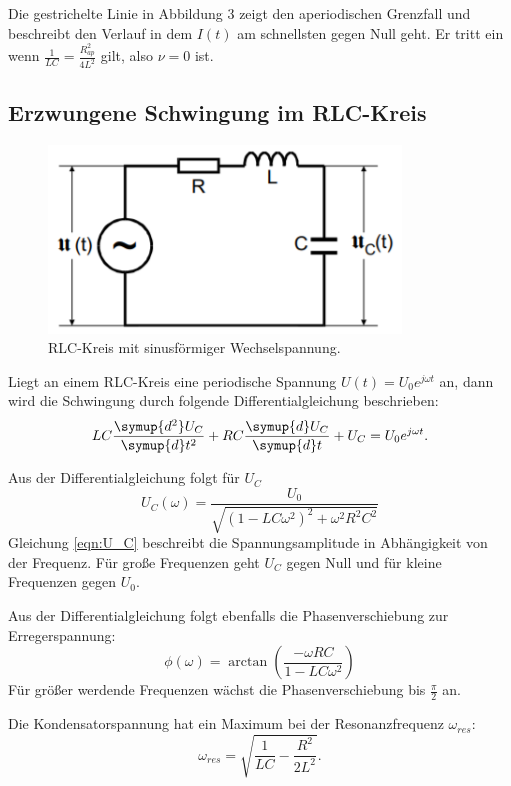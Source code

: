 Die gestrichelte Linie in Abbildung 3 zeigt den aperiodischen Grenzfall und beschreibt den Verlauf
in dem $I(t)$ am schnellsten gegen Null geht. Er tritt ein wenn $\frac{1}{LC}=\frac{R_{ap}^2}{4L^2}$ gilt, also $\nu = 0$ ist.


\subsection{Erzwungene Schwingung im RLC-Kreis}
\begin{figure}[H]
  \centering
  \includegraphics[height=5cm]{wechselspannung.PNG}
  \caption{RLC-Kreis mit sinusförmiger Wechselspannung. \cite{sample}}
  \label{fig:wechselspannung}
\end{figure}

Liegt an einem RLC-Kreis eine periodische Spannung $U(t) = U_0 e^{j\omega t}$ an, dann wird die Schwingung durch folgende
Differentialgleichung beschrieben:
\begin{align}
  LC\frac{\symup{d^2}U_C}{\symup{d}t^2} + RC\frac{\symup{d}U_C}{\symup{d}t} + U_C = U_0 e^{j\omega t}.
\end{align}

Aus der Differentialgleichung folgt für $U_C$
\begin{equation}
  U_C(\omega) = \frac{U_0}{\sqrt{\left(1-LC\omega^2 \right)^2 + \omega^2 R^2 C^2}} \label{eqn:U_C}
\end{equation}
Gleichung \eqref{eqn:U_C} beschreibt die Spannungsamplitude in Abhängigkeit von der Frequenz. Für große Frequenzen
geht $U_C$ gegen Null und für kleine Frequenzen gegen $U_0$.

Aus der Differentialgleichung folgt ebenfalls die Phasenverschiebung zur Erregerspannung:
\begin{equation}
  \phi (\omega) = \arctan{\left(\frac{-\omega R C}{1 - LC \omega^2}\right)}
\end{equation}
Für größer werdende Frequenzen wächst die Phasenverschiebung bis $\frac{\pi}{2}$ an.

Die Kondensatorspannung hat ein Maximum bei der Resonanzfrequenz $\omega_{res}$:
\begin{equation}
  \omega_{res} = \sqrt{\frac{1}{LC} - \frac{R^2}{2L^2}}.
\end{equation}

